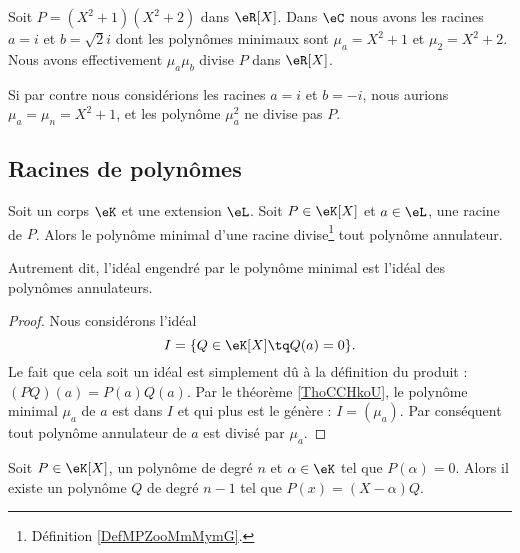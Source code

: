 \begin{example}
    Soit \( P=(X^2+1)(X^2+2)\) dans \( \eR[X]\). Dans \( \eC\) nous avons les racines \( a=i\) et \( b=\sqrt{2}i\) dont les polynômes minimaux sont \( \mu_a=X^2+1\) et \( \mu_2=X^2+2\). Nous avons effectivement \( \mu_a\mu_b\) divise \( P\) dans \( \eR[X]\).

    Si par contre nous considérions les racines \( a=i\) et \( b=-i\), nous aurions \( \mu_a=\mu_n=X^2+1\), et les polynôme \( \mu_a^2\) ne divise pas \( P\).
\end{example}

\subsection{Racines de polynômes}

\begin{proposition}\label{PropXULooPCusvE}
    Soit un corps \( \eK\) et une extension \( \eL\). Soit \( P\in \eK[X]\) et  \( a\in \eL\), une racine de \( P\). Alors le polynôme minimal d'une racine divise\footnote{Définition \ref{DefMPZooMmMymG}.} tout polynôme annulateur.

    Autrement dit, l'idéal engendré par le polynôme minimal est l'idéal des polynômes annulateurs.
\end{proposition}

\begin{proof}
    Nous considérons l'idéal
    \begin{equation}
        I=\{ Q\in \eK[X]\tq Q(a)=0 \}.
    \end{equation}
    Le fait que cela soit un idéal est simplement dû à la définition du produit : \( (PQ)(a)=P(a)Q(a)\). Par le théorème \ref{ThoCCHkoU}, le polynôme minimal \( \mu_a\) de \( a\) est dans \( I\) et qui plus est le génère : \( I=(\mu_a)\). Par conséquent tout polynôme annulateur de \( a\) est divisé par \( \mu_a\).
\end{proof}

\begin{corollary}   \label{CorDIYooEtmztc}
    Soit \( P\in \eK[X]\), un polynôme de degré \( n\) et \( \alpha\in \eK\) tel que \( P(\alpha)=0\). Alors il existe un polynôme \( Q\) de degré \( n-1\) tel que \( P(x)=(X-\alpha)Q\).
\end{corollary}

